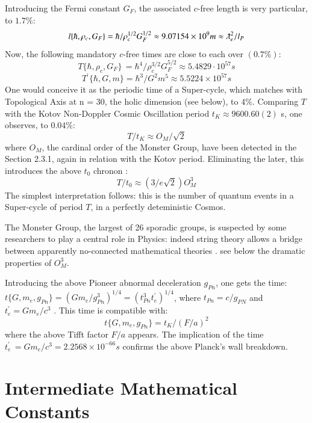 \documentclass[twoside,draft]{article}
\begin{document}
\begin{sloppypar}
{Introducing the Fermi constant $G_{F}$, the associated $c$-free length is very particular, to $1.7\%$:
$$l\{\hbar,\rho_{c},G_{F}\} = \hbar/\rho_{c}^{1/2} G_{F}^{1/2} \approx 9.07154 \times 10^{9} m \approx \lambdabar_{e}^{2}/l_{P}$$
Now, the following mandatory $c$-free times are close to each over $(0.7\%)$:
\begin{equation}
T\{\hbar,\rho_{c} ,G_{F} \}\, = \hbar^{4} /\rho_{c}^{3/2} G_{F}^{5/2} \approx 5.4829 \cdot 10^{57} s
\end{equation}
\begin{equation}
T^{\prime}\{\hbar,G,m\} = \hbar^{3} /G^{2} m^{5} \approx 5.5224 \times 10^{57} s
\end{equation}
One would conceive it as the periodic time of a Super-cycle, which matches with Topological Axis at n = 30,
the holic dimension (see below), to 4\%. Comparing $T$ with the Kotov Non-Doppler Cosmic
Oscillation period $t_{K} \approx 9600.60(2)$ s, one observes, to $0.04\%$:
$$T/t_{K} \approx O_{M} /\sqrt{2}$$
where $O_{M}$, the cardinal order of the Monster Group, have been detected in the Section 2.3.1, again in relation with the Kotov period. Eliminating the later, this introduces the above $t_0$ chronon :
\begin{equation}
T/t_0 \approx (3/e\sqrt{2})O_M^3
\end{equation}
The simplest interpretation follows: this is the number of quantum events in a Super-cycle of period $T$, in a perfectly deteministic Cosmos. 

The  Monster  Group,  the largest of 26 sporadic groups, is suspected by some researchers to play a central role in Physics: indeed string theory allows a bridge between apparently no-connected mathematical theories \cite{Borcherds}. see below the dramatic properties of $O_M^3$.

Introducing the above Pioneer abnormal deceleration $g_{Pn}$, one gets the time: 
$
t\{G, m_{e} , g_{Pn} \} = (Gm_{e} /g_{Pn}^{3} )^{1/4} = (t_{Pn}^{3} t^{\prime}_{e} )^{1/4}
$, where $t_{Pn} = c/g_{PN}$ and $t^{\prime}_{e} = Gm_{e} /c^{3}$ . This time is compatible with:
\begin{equation}
t\{G, m_{e} , g_{Pn} \} = t_{K} /(F/a)^{2}
\end{equation}
where the above Tifft factor $F/a$ appears. The implication of the time 
$t^{\prime}_{e}\, = Gm_{e} /c^{3} = 2.2568 \times 10^{-66} s$
confirms the above Planck's wall breakdown.

\section{Intermediate Mathematical Constants}
}
\end{sloppypar}
\end{document}
